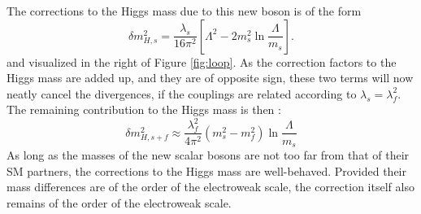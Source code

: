 The corrections to the Higgs mass due to this new boson is of the form
\begin{equation}
\delta m_{H,s}^{2}=\frac{\lambda_{s}}{16\pi^{2}}\left[\Lambda^{2}-2m_{s}^{2}\ln\frac{\Lambda}{m_{s}}\right].
\end{equation}                                                                                                                 
and visualized in the right of Figure \ref{fig:loop}. 
As the correction factors to the Higgs mass are added up, and they are of opposite sign, these two terms will now neatly cancel the divergences, if the couplings are related according to $\lambda_{s}=\lambda_{f}^{2}$. 
The remaining contribution to the Higgs mass is then \cite{Pape:2006ar}:
\begin{equation}
\delta m_{H,s+f}^{2}\approx\frac{\lambda_{f}^{2}}{4\pi^{2}}(m_{s}^{2}-m_{f}^{2})\ln\frac{\Lambda}{m_{s}}
\end{equation}                                                                                                                 
As long as the masses of the new scalar bosons are not too far from that of their SM partners, the corrections to the Higgs mass are well-behaved.
Provided their mass differences are of the order of the electroweak scale, the correction itself also remains of the order of the electroweak scale. 
